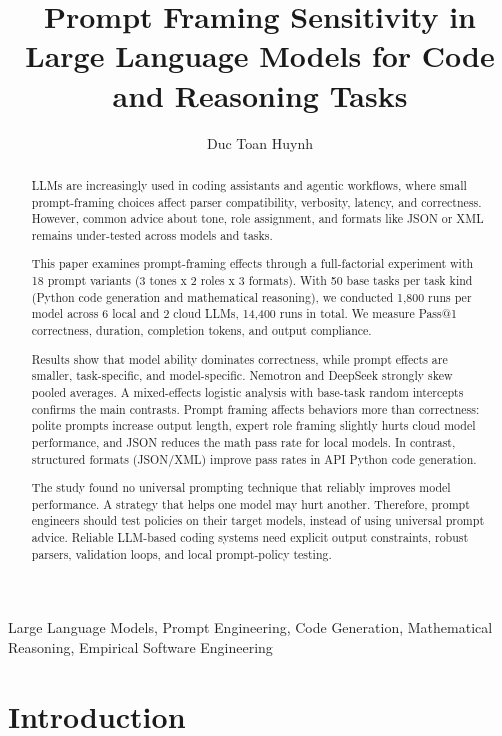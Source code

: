 \documentclass{llncs}
\title{Prompt Framing Sensitivity in Large Language Models for Code and Reasoning Tasks}
\author{Duc Toan Huynh}
\institute{ M.Sc. Data Science, University of Europe for Applied Sciences\\
Supervisors: Prof.~Dr.~Iftikhar Ahmed and Dr.~Sami ur Rahman}
\begin{document}
\maketitle

\begin{abstract}
LLMs are increasingly used in coding assistants and agentic workflows, where small prompt-framing choices affect parser compatibility, verbosity, latency, and correctness. However, common advice about tone, role assignment, and formats like JSON or XML remains under-tested across models and tasks.

This paper examines prompt-framing effects through a full-factorial experiment with 18 prompt variants (3 tones x 2 roles x 3 formats). With 50 base tasks per task kind (Python code generation and mathematical reasoning), we conducted 1,800 runs per model across 6 local and 2 cloud LLMs, 14,400 runs in total. We measure Pass@1 correctness, duration, completion tokens, and output compliance.

Results show that model ability dominates correctness, while prompt effects are smaller, task-specific, and model-specific. Nemotron and DeepSeek strongly skew pooled averages. A mixed-effects logistic analysis with base-task random intercepts confirms the main contrasts. Prompt framing affects behaviors more than correctness: polite prompts increase output length, expert role framing slightly hurts cloud model performance, and JSON reduces the math pass rate for local models. In contrast, structured formats (JSON/XML) improve pass rates in API Python code generation.

The study found no universal prompting technique that reliably improves model performance. A strategy that helps one model may hurt another. Therefore, prompt engineers should test policies on their target models, instead of using universal prompt advice. Reliable LLM-based coding systems need explicit output constraints, robust parsers, validation loops, and local prompt-policy testing.

\end{abstract}

\begin{keywords}
Large Language Models, Prompt Engineering, Code Generation, Mathematical Reasoning, Empirical Software Engineering

\end{keywords}


\section{Introduction}\label{sec:introduction}
\end{document}
